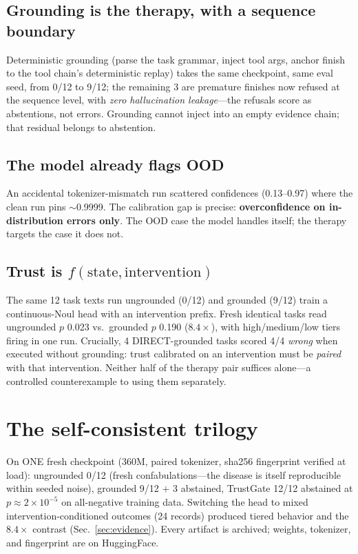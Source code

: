 \documentclass[11pt]{article}
\begin{document}
\subsection{Grounding is the therapy, with a sequence boundary}

Deterministic grounding (parse the task grammar, inject tool args,
anchor finish to the tool chain's deterministic replay) takes the same
checkpoint, same eval seed, from 0/12 to 9/12; the remaining 3 are
premature finishes now refused at the sequence level, with \emph{zero
hallucination leakage}---the refusals score as abstentions, not errors.
Grounding cannot inject into an empty evidence chain; that residual
belongs to abstention.

\subsection{The model already flags OOD}

An accidental tokenizer-mismatch run scattered confidences (0.13--0.97)
where the clean run pins $\sim$0.9999. The calibration gap is precise:
\textbf{overconfidence on in-distribution errors only}. The OOD case
the model handles itself; the therapy targets the case it does not.

\subsection{Trust is $f(\text{state}, \text{intervention})$}

The same 12 task texts run ungrounded (0/12) and grounded (9/12) train
a continuous-Noul head with an intervention prefix. Fresh identical
tasks read ungrounded $p$ 0.023 vs.\ grounded $p$ 0.190 ($8.4\times$),
with high/medium/low tiers firing in one run. Crucially, 4
DIRECT-grounded tasks scored 4/4 \emph{wrong} when executed without
grounding: trust calibrated on an intervention must be \emph{paired}
with that intervention. Neither half of the therapy pair suffices
alone---a controlled counterexample to using them separately.

\section{The self-consistent trilogy}
\label{sec:trilogy}

On ONE fresh checkpoint (360M, paired tokenizer, sha256 fingerprint
verified at load): ungrounded 0/12 (fresh confabulations---the disease
is itself reproducible within seeded noise), grounded 9/12 $+$ 3
abstained, TrustGate 12/12 abstained at $p \approx 2\times 10^{-5}$ on
all-negative training data. Switching the head to mixed
intervention-conditioned outcomes (24 records) produced tiered behavior
and the $8.4\times$ contrast (Sec.~\ref{sec:evidence}). Every artifact
is archived; weights, tokenizer, and fingerprint are on HuggingFace.
\end{document}
